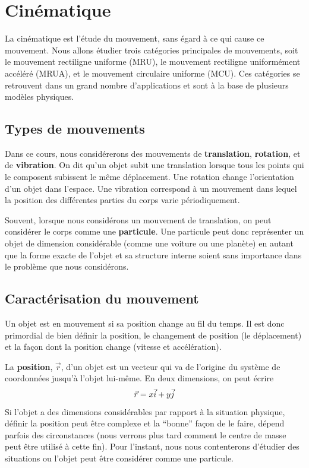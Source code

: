 \chapter{Cinématique}

La cinématique est l'étude du mouvement, sans égard à ce qui cause ce
mouvement.  Nous allons étudier trois catégories principales de mouvements, soit
le mouvement rectiligne uniforme (MRU), le mouvement rectiligne uniformément
accéléré (MRUA), et le mouvement circulaire uniforme (MCU).  Ces catégories se
retrouvent dans un grand nombre d'applications et sont à la base de plusieurs
modèles physiques.


\section{Types de mouvements}

\begin{marginfigure}
\end{marginfigure}
Dans ce cours, nous considérerons des mouvements de \textbf{translation},
\textbf{rotation}, et de \textbf{vibration}.  On dit qu'un objet subit une
translation lorsque tous les points qui le composent subissent le même
déplacement.  Une rotation change l'orientation d'un objet dans l'espace.  Une
vibration correspond à un mouvement dans lequel la position des différentes
parties du corps varie périodiquement.

Souvent, lorsque nous considérons un mouvement de translation, on peut
considérer le corps comme une \textbf{particule}.  Une particule peut donc
représenter un objet de dimension considérable (comme une voiture ou une
planète) en autant que la forme exacte de l'objet et sa structure interne
soient sans importance dans le problème que nous considérons.


\section{Caractérisation du mouvement}

Un objet est en mouvement si sa position change au fil du temps.  Il est donc
primordial de bien définir la position, le changement de position (le
déplacement) et la façon dont la position change (vitesse et accélération).

La \textbf{position}, $\vec{r}$, d'un objet est un vecteur qui va de l'origine
du système de coordonnées jusqu'à l'objet lui-même.  En deux dimensions, on
peut écrire
\[
  \vec{r} = x \vec{i} + y \vec{j}
\]
Si l'objet a des dimensions considérables par rapport à la situation physique,
définir la position peut être complexe et la ``bonne'' façon de le faire,
dépend parfois des circonstances (nous verrons plus tard comment le centre de
masse peut être utilisé à cette fin).  Pour l'instant, nous nous contenterons
d'étudier des situations ou l'objet peut être considérer comme une particule.


